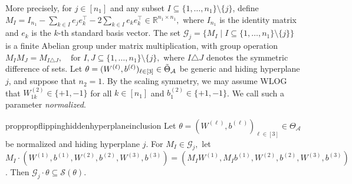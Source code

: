 \documentclass{article}
\theoremstyle{definition}
\newcommand{\R}{\mathbb{R}}
\newcommand{\architecture}{\mathcal{A}}
\newcommand{\paramspace}[1]{\Theta_{#1}}
\newcommand{\gparamspace}[1]{\Tilde{\Theta}_{#1}}
\newcommand{\weights}[1]{W^{(#1)}}
\newcommand{\bias}[1]{b^{(#1)}}
\newcommand{\fiber}[1]{\mathcal{S}({#1})}
\begin{document}
More precisely, for $j \in [n_1]$ and any subset $I \subseteq \{1,\dots,n_1\} \setminus \{j\}$, define
\(
M_I = I_{n_1} - \sum_{k \in I} e_j e_k^\top - 2 \sum_{k \in I} e_k e_k^\top \in \R^{n_1 \times n_1},
\)
where $I_{n_1}$ is the identity matrix and $e_k$ is the $k$-th standard basis vector. 
The set
\(
\mathcal{G}_j = \{ M_I \mid I \subseteq \{1,\dots,n_1\} \setminus \{j\} \}
\)
is a finite Abelian group under matrix multiplication, with group operation
\(
M_I M_J = M_{I \triangle J}, \quad \text{for } I,J \subseteq \{1,\dots,n_1\}\setminus\{j\},
\)
where $I \triangle J$ denotes the symmetric difference of sets.  
Let $\theta = (\weights{\ell},\bias{\ell})_{\ell \in [3]} \in \gparamspace{\architecture}$ be generic and hiding hyperplane $j$, and suppose that $n_2 =1$. 
%
By the scaling symmetry, we may assume WLOG that $\weights{2}_{1k} \in \{+1,-1\}$ for all $k \in [n_1]$ and  
$\bias{2}_1 \in \{+1,-1\}$. We call such a parameter \emph{normalized}. 

\begin{restatable}{prop}{propflippinghiddenhyperplaneinclusion}
\label{prop:flipping_hidden_hyperplane_inclusion}
    Let $\theta = (\weights{\ell},\bias{\ell})_{\ell \in [3]} \in \paramspace{\architecture}$ be normalized and hiding hyperplane $j$.
For $M_I\in\mathcal{G}_j,$ let 
$M_I\cdot(\weights{1}, \bias{1}, \weights{2}, \bias{2}, \weights{3}, \bias{3})=(M_{I}\weights{1}, M_{I} \bias{1}, \weights{2}, \bias{2}, \weights{3}, \bias{3})$. 
    Then \( \mathcal{G}_j \cdot \theta \subseteq
\fiber{\theta} \). 
\end{restatable} 
\end{document}
